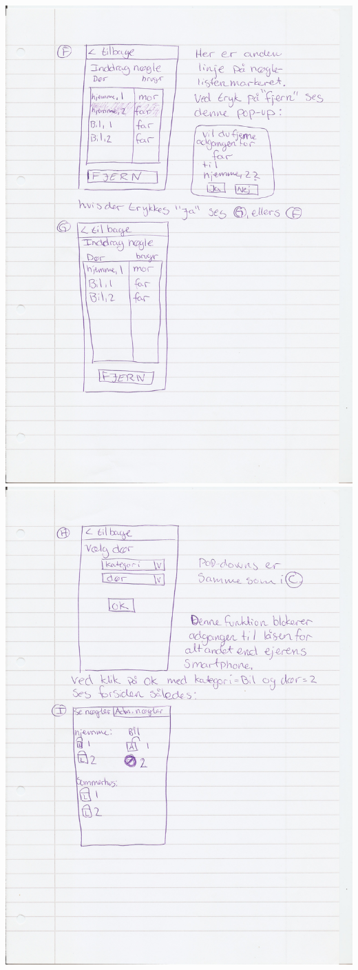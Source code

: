 \documentclass[a4paper,12pt]{article}
\begin{document}
\includegraphics[width=\textwidth]{proto/FG.jpg}
\includegraphics[width=\textwidth]{proto/HI.jpg}
\end{document}
